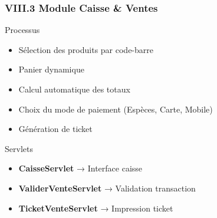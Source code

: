 \documentclass[11pt, aspectratio=169]{beamer}
\begin{document}
\begin{frame}
    \frametitle{VIII.3 Module Caisse \& Ventes}
    
    \begin{block}{Processus}
        \begin{itemize}
            \item[\faCashRegister] Sélection des produits par code-barre
            \item[\faShoppingCart] Panier dynamique
            \item[\faCalculator] Calcul automatique des totaux
            \item[\faMoneyBillWave] Choix du mode de paiement (Espèces, Carte, Mobile)
            \item[\faTicketAlt] Génération de ticket
        \end{itemize}
    \end{block}
    
    \vspace{0.8cm}
    
    \begin{block}{Servlets}
        \begin{itemize}
            \item \textbf{CaisseServlet} → Interface caisse
            \item \textbf{ValiderVenteServlet} → Validation transaction
            \item \textbf{TicketVenteServlet} → Impression ticket
        \end{itemize}
    \end{block}
\end{frame}
\end{document}
